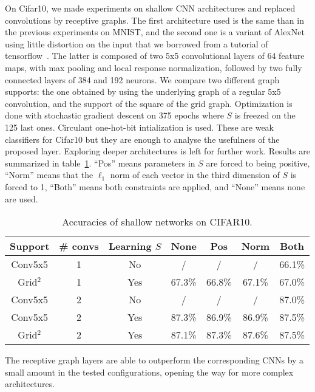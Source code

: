 On Cifar10, we made experiments on shallow CNN architectures and replaced convolutions by receptive graphs. The first architecture used is the same than in the previous experiments on MNIST, and the second one is a variant of AlexNet~\cite{krizhevsky2012imagenet} using little distortion on the input that we borrowed from a tutorial of tensorflow~\cite{tensorflow2015-whitepaper}.
The latter is composed of two 5x5 convolutional layers of 64 feature maps, with max pooling and local response normalization, followed by two fully connected layers of 384 and 192 neurons.
We compare two different graph supports: the one obtained by using the underlying graph of a regular 5x5 convolution, and the support of the square of the grid graph. Optimization is done with stochastic gradient descent on 375 epochs where $S$ is freezed on the 125 last ones. Circulant one-hot-bit intialization is used. These are weak classifiers for Cifar10 but they are enough to analyse the usefulness of the proposed layer. Exploring deeper architectures is left for further work. Results are summarized in table~\ref{cifar}. ``Pos'' means parameters in $S$ are forced to being positive, ``Norm'' means that the $\ell_1$ norm of each vector in the third dimension of $S$ is forced to 1, ``Both'' means both constraints are applied, and ``None'' means none are used.

\begin{table}[h]
  \caption{Accuracies of shallow networks on CIFAR10.}
  \begin{center}
    \bgroup
    \def\arraystretch{1.5}%
    \begin{tabular}{|c|c|c|c|c|c|c|}
      \hline
      Support & \# convs & Learning $S$ & None & Pos & Norm & Both\\
      \hline
      \hline
      Conv5x5 & 1 & No & / & / & / & 66.1\%\\
      \hline
      Grid$^2$ & 1 & Yes & 67.3\% & 66.8\% & 67.1\% & 67.0\%\\
      \hline
      Conv5x5 & 2 & No & / & / & / & 87.0\%\\
      \hline
      Conv5x5 & 2 & Yes & 87.3\% & 86.9\% & 86.9\% & 87.5\%\\
      \hline
      Grid$^2$ & 2 & Yes & 87.1\% & 87.3\% & 87.6\% & 87.5\%\\
      \hline
    \end{tabular}
    \egroup
  \end{center}
  \label{cifar}
\end{table}

The receptive graph layers are able to outperform the corresponding CNNs by a small amount in the tested configurations, opening the way for more complex architectures.